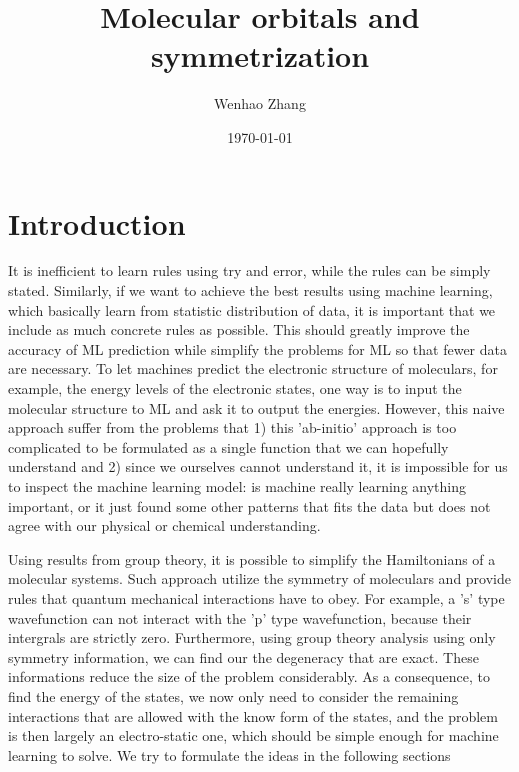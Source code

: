 \documentclass{article}
\begin{document}
\title{Molecular orbitals and symmetrization}
\author{Wenhao Zhang}
\date{\today}
\maketitle

\section{Introduction}

It is inefficient to learn rules using try and error, while the rules can be 
simply stated. 
Similarly, if we want to achieve the best results using machine learning, which 
basically learn from statistic distribution of data, 
it is important that we include as much concrete rules as possible. 
This should greatly improve the accuracy of ML prediction while simplify the 
problems for ML so that fewer data are necessary.
To let machines predict the electronic structure of moleculars, for example, the 
energy levels of the electronic states, 
one way is to input the molecular structure to ML and ask it to output the energies. 
However, this naive approach suffer from the problems that 1) this 'ab-initio' approach
is too complicated to be formulated as a single function that we can hopefully understand 
and 2) since we ourselves cannot understand it, it is impossible for us to inspect the 
machine learning model: is machine really learning anything important, or it just 
found some other patterns that fits the data but does not agree with our physical 
or chemical understanding. 

Using results from group theory, it is possible to simplify the Hamiltonians of 
a molecular systems. Such approach utilize the symmetry of moleculars and provide
rules that quantum mechanical interactions have to obey. 
For example, a 's' type wavefunction can not interact with the 'p' type wavefunction,
because their intergrals are strictly zero. 
Furthermore, using group theory analysis using only symmetry information, we can find 
our the degeneracy that are exact. 
These informations reduce the size of the problem considerably. As a consequence, to 
find the energy of the states, we now only need to consider the remaining interactions 
that are allowed with the know form of the states, and the problem is then largely 
an electro-static one, which should be simple enough for machine learning to solve.
We try to formulate the ideas in the following sections
\end{document}

